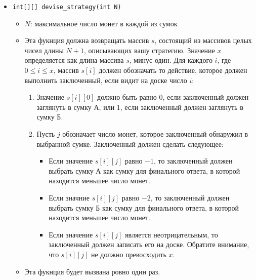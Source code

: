 \begin{itemize}
\item \texttt{int[][] devise\_strategy(int N)}
 \begin{itemize}
\item $N$: максимальное число монет в каждой из сумок
\item Эта фукнция должна возвращать массив $s$, состоящий из массивов целых чисел длины $N + 1$, описывающих вашу стратегию.
Значение $x$ определяется как длина массива $s$, минус один.
Для каждого $i$, где $0 \le i \le x$, массив $s[i]$ должен обозначать то действие, которое должен выполнить заключенный, если видит на доске число $i$:
 \begin{enumerate}
  \item Значение $s[i][0]$ должно быть равно $0$, если заключенный должен заглянуть в сумку А, или $1$, если заключенный должен заглянуть в сумку Б.
 \item Пусть $j$ обозначает число монет, которое заключенный обнаружил в выбранной сумке. Заключенный должен сделать следующее:
  \begin{itemize}
    \item Если значение $s[i][j]$ равно $-1$, то заключенный должен выбрать сумку А как сумку для финального ответа, в которой находится меньшее число монет.
    \item Если значние $s[i][j]$ равно $-2$, то заключенный должен выбрать сумку Б как сумку для финального ответа, в которой находится меньшее число монет.
    \item Если значение $s[i][j]$ является неотрицательным, то заключенный должен записать его на доске. Обратите внимание, что $s[i][j]$ не должно превосходить $x$.
     \end{itemize}
     \end{enumerate}
\item Эта фукнция будет вызвана ровно один раз.
 \end{itemize}
  \end{itemize}

